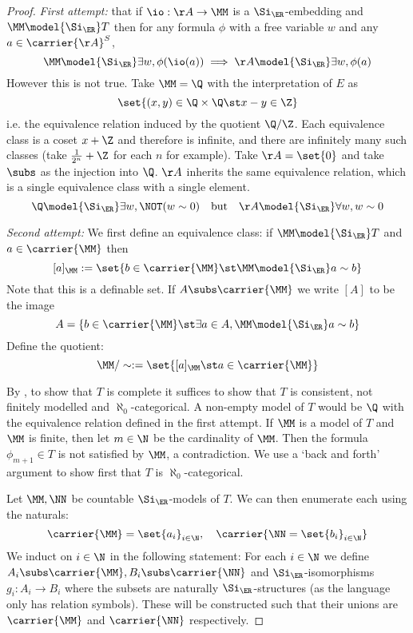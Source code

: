 \begin{proof}
    \emph{First attempt:}
    that if $\io : \AA \to \MM$ is a $\Si_\ER$-embedding
    and $\MM \model{\Si_\ER} T$ then for any formula $\phi$ with a 
    free variable $w$ and any $a \in \carrier{\AA}^S$,
    \[
        \MM \model{\Si_\ER} \exists w, \phi(\io(a)) \implies 
        \AA \model{\Si_\ER} \exists w, \phi(a)
    \]
    However this is not true. 
    Take $\MM = \Q$ with the interpretation of $E$ as 
    \[\set{(x,y) \in \Q \times \Q \st x - y \in \Z}\]
    i.e. the equivalence relation induced by the quotient $\Q / \Z$.
    Each equivalence class is a coset $x + \Z$ and therefore is infinite,
    and there are infinitely many such classes 
    (take $\frac{1}{2^n} + \Z$ for each $n$ for example).
    Take $\AA = \set{0}$ and take $\subs$ as the injection into $\Q$.
    $\AA$ inherits the same equivalence relation, 
    which is a single equivalence class with a single element.
    \[
        \Q \model{\Si_\ER} \exists w, \NOT (w \sim 0)
        \quad \text{but} \quad 
        \AA \model{\Si_\ER} \forall w, w \sim 0
    \]

    \emph{Second attempt:}
    We first define an equivalence class:
    if $\MM \model{\Si_\ER} T$ and $a \in \carrier{\MM}$ then 
    \[[a]_\MM := \set{b \in \carrier{\MM} \st \MM \model{\Si_\ER} a \sim b}\]
    Note that this is a definable set.
    If $A \subs \carrier{\MM}$ we write $[A]$ to be the image
    \[A = \{b \in \carrier{\MM} \st \exists a \in A, 
    \MM \model{\Si_\ER} a \sim b\}\]
    Define the quotient:
    \[\MM / \sim := \set{[a]_\MM \st a \in \carrier{\MM}}\]
    
    By , to show that $T$ is complete
    it suffices to show that $T$ is consistent, 
    not finitely modelled and $\aleph_0$-categorical.
    A non-empty model of $T$ would be $\Q$ 
    with the equivalence relation defined in 
    the first attempt.
    If $\MM$ is a model of $T$ and $\MM$ is finite,
    then let $m \in \N$ be the cardinality of $\MM$.
    Then the formula $\phi_{m+1} \in T$ is not satisfied by $\MM$,
    a contradiction.
    We use a `back and forth' argument to show first that 
    $T$ is $\aleph_0$-categorical. 

    Let $\MM, \NN$ be countable $\Si_\ER$-models of $T$.
    We can then enumerate each using the naturals:
    \[\carrier{\MM} = \set{a_i}_{i \in \N}, 
    \quad \carrier{\NN = \set{b_i}_{i \in \N}}\]
    We induct on $i \in \N$ in the following statement:
    For each $i \in \N$ we define 
    $A_i \subs \carrier{\MM}, B_i \subs \carrier{\NN}$
    and $\Si_\ER$-isomorphisms $g_i : A_i \to B_i$
    where the subsets are naturally $\Si_\ER$-structures
    (as the language only has relation symbols).
    These will be constructed such that their unions are 
    $\carrier{\MM}$ and $\carrier{\NN}$ respectively.
    

\end{proof}
